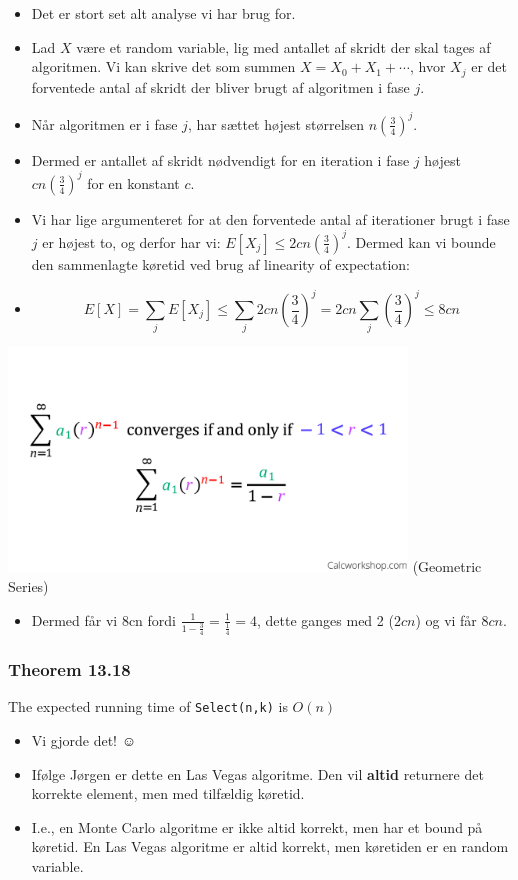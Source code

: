 \documentclass{beamer}
\begin{document}
\begin{frame}[allowframebreaks]
\begin{itemize}
\item Det er stort set alt analyse vi har brug for. 
\item Lad $X$ være et random variable, lig med antallet af skridt der skal tages af algoritmen. Vi kan skrive det som summen $X = X_{0} + X_{1} + \cdots$, hvor $X_{j}$ er det forventede antal af skridt der bliver brugt af algoritmen i fase $j$.
\item Når algoritmen er i fase $j$, har sættet højest størrelsen $n \left( \frac{3}{4} \right)^{j}$.
\item Dermed er antallet af skridt nødvendigt for en iteration i fase $j$ højest $cn (\frac{3}{4})^{j}$ for en konstant $c$. 
\item Vi har lige argumenteret for at den forventede antal af iterationer brugt i fase $j$ er højest to, og derfor har vi: $E[X_{j}] \leq 2cn(\frac{3}{4})^{j}$. Dermed kan vi bounde den sammenlagte køretid ved brug af linearity of expectation: 
\item \[ E[X] = \sum_{j} E[X_{j}] \leq \sum_{j} 2cn \left( \frac{3}{4} \right)^{j} = 2cn \sum_{j}^{} \left( \frac{3}{4} \right)^{j} \leq 8cn \]
\end{itemize}

\includegraphics[width=300pt]{main--randomized-divide-and-conquer-median-finding-and-quicksort--finding-the-median-afbb.png}
(Geometric Series)

\begin{itemize}
\item Dermed får vi 8cn fordi $\frac{1}{1- \frac{3}{4}} = \frac{1}{\frac{1}{4}} = 4$, dette ganges med 2 ($2cn$) og vi får $8cn$.
\end{itemize}
\end{frame}

\begin{frame}
  \frametitle{Theorem 13.18}
  \begin{theorem}[13.18]
The expected running time of \texttt{Select(n,k)} is $O(n)$
  \end{theorem}
\begin{itemize}
\item Vi gjorde det!  $\smiley$ 
\item Ifølge Jørgen er dette en Las Vegas algoritme. Den vil \textbf{altid} returnere det korrekte element, men med tilfældig køretid.
\item I.e., en Monte Carlo algoritme er ikke altid korrekt, men har et bound på køretid. En Las Vegas algoritme er altid korrekt, men køretiden er en random variable.
\end{itemize}
\end{frame}
\end{document}
